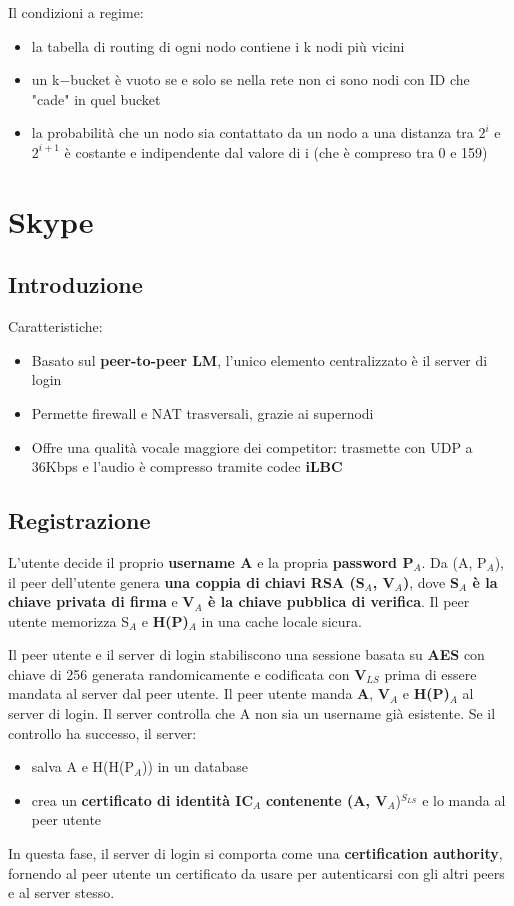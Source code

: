 Il condizioni a regime:
\begin{itemize}
    \item la tabella di routing di ogni nodo contiene i k nodi più vicini
    \item un k$-$bucket è vuoto se e solo se nella rete non ci sono nodi con ID che "cade" in quel bucket
    \item la probabilità che un nodo sia contattato da un nodo a una distanza tra $2^i$ e $2^{i+1}$ è costante e indipendente dal valore di i (che è compreso tra 0 e 159)
\end{itemize}


\chapter{Skype}
\section{Introduzione}
Caratteristiche:
\begin{itemize}
    \item Basato sul \textbf{peer-to-peer LM}, l'unico elemento centralizzato è il server di login
    \item Permette firewall e NAT trasversali, grazie ai supernodi
    \item Offre una qualità vocale maggiore dei competitor: trasmette con UDP a 36Kbps e l'audio è compresso tramite codec \textbf{iLBC}
\end{itemize}


\section{Registrazione}
L'utente decide il proprio \textbf{username A} e la propria \textbf{password P$_A$}. Da (A, P$_A$), il peer dell'utente genera \textbf{una coppia di chiavi RSA (S$_A$, V$_A$)}, dove \textbf{S$_A$ è la chiave privata di firma} e \textbf{V$_A$ è la chiave pubblica di verifica}. Il peer utente memorizza S$_A$ e \textbf{H(P)}$_A$ in una cache locale sicura. 

Il peer utente e il server di login stabiliscono una sessione basata su \textbf{AES} con chiave di 256 generata randomicamente e codificata con \textbf{V}$_{LS}$ prima di essere mandata al server dal peer utente. Il peer utente manda \textbf{A}, \textbf{V}$_A$ e \textbf{H(P)}$_A$ al server di login. Il server controlla che A non sia un username già esistente. Se il controllo ha successo, il server:
\begin{itemize}
    \item salva A e H(H(P$_A$)) in un database
    \item crea un \textbf{certificato di identità IC}$_A$ \textbf{contenente (A, V}$_A$)$^{S_{LS}}$ e lo manda al peer utente
\end{itemize}
In questa fase, il server di login si comporta come una \textbf{certification authority}, fornendo al peer utente un certificato da usare per autenticarsi con gli altri peers e al server stesso. 

